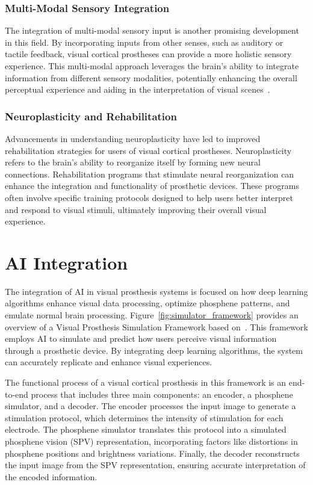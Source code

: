 \documentclass[twocolumn,10pt]{article}
\begin{document}
\subsubsection*{Multi-Modal Sensory Integration}
The integration of multi-modal sensory input is another promising development in
this field. By incorporating inputs from other senses, such as auditory or
tactile feedback, visual cortical prostheses can provide a more holistic sensory
experience. This multi-modal approach leverages the brain's ability to integrate
information from different sensory modalities, potentially enhancing the overall
perceptual experience and aiding in the interpretation of visual
scenes~\parencite{wanArtificialSensoryNeuron2020}.

\subsubsection*{Neuroplasticity and Rehabilitation}
Advancements in understanding neuroplasticity have led to improved
rehabilitation strategies for users of visual cortical prostheses.
Neuroplasticity refers to the brain's ability to reorganize itself by forming
new neural connections. Rehabilitation programs that stimulate neural
reorganization can enhance the integration and functionality of prosthetic
devices. These programs often involve specific training protocols designed to
help users better interpret and respond to visual stimuli, ultimately improving
their overall visual experience.

\section{AI Integration}\label{sec:ai_integration}
The integration of AI in visual prosthesis systems is focused on how deep
learning algorithms enhance visual data processing, optimize phosphene patterns,
and emulate normal brain processing. Figure~\ref{fig:simulator_framework}
provides an overview of a Visual Prosthesis Simulation Framework based
on~\parencite{deruytervansteveninckEndtoendOptimizationProsthetic2022}. This
framework employs AI to simulate and predict how users perceive visual
information through a prosthetic device. By integrating deep learning
algorithms, the system can accurately replicate and enhance visual experiences.

The functional process of a visual cortical prosthesis in this framework is an
end-to-end process that includes three main components: an encoder, a phosphene
simulator, and a decoder. The encoder processes the input image to generate a
stimulation protocol, which determines the intensity of stimulation for each
electrode. The phosphene simulator translates this protocol into a simulated
phosphene vision (SPV) representation, incorporating factors like distortions in
phosphene positions and brightness variations. Finally, the decoder reconstructs
the input image from the SPV representation, ensuring accurate interpretation of
the encoded information.
\end{document}
